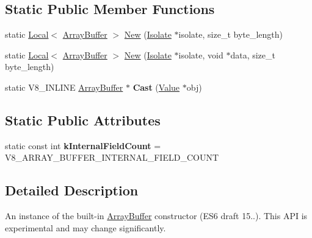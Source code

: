 \subsection*{Static Public Member Functions}
\begin{DoxyCompactItemize}
\item 
static \hyperlink{classv8_1_1Local}{Local}$<$ \hyperlink{classv8_1_1ArrayBuffer}{Array\-Buffer} $>$ \hyperlink{classv8_1_1ArrayBuffer_ad752e03d7cc7fe863656ad6183785ab7}{New} (\hyperlink{classv8_1_1Isolate}{Isolate} $\ast$isolate, size\-\_\-t byte\-\_\-length)
\item 
static \hyperlink{classv8_1_1Local}{Local}$<$ \hyperlink{classv8_1_1ArrayBuffer}{Array\-Buffer} $>$ \hyperlink{classv8_1_1ArrayBuffer_ad3e0120ae80077d607d5645c4f647932}{New} (\hyperlink{classv8_1_1Isolate}{Isolate} $\ast$isolate, void $\ast$data, size\-\_\-t byte\-\_\-length)
\item 
\hypertarget{classv8_1_1ArrayBuffer_a4b0a703ae34217507a8ebc9cabf7336a}{static V8\-\_\-\-I\-N\-L\-I\-N\-E \hyperlink{classv8_1_1ArrayBuffer}{Array\-Buffer} $\ast$ {\bfseries Cast} (\hyperlink{classv8_1_1Value}{Value} $\ast$obj)}\label{classv8_1_1ArrayBuffer_a4b0a703ae34217507a8ebc9cabf7336a}

\end{DoxyCompactItemize}
\subsection*{Static Public Attributes}
\begin{DoxyCompactItemize}
\item 
\hypertarget{classv8_1_1ArrayBuffer_af49000a2ea120e49da846ef02a42ac69}{static const int {\bfseries k\-Internal\-Field\-Count} = V8\-\_\-\-A\-R\-R\-A\-Y\-\_\-\-B\-U\-F\-F\-E\-R\-\_\-\-I\-N\-T\-E\-R\-N\-A\-L\-\_\-\-F\-I\-E\-L\-D\-\_\-\-C\-O\-U\-N\-T}\label{classv8_1_1ArrayBuffer_af49000a2ea120e49da846ef02a42ac69}

\end{DoxyCompactItemize}


\subsection{Detailed Description}
An instance of the built-\/in \hyperlink{classv8_1_1ArrayBuffer}{Array\-Buffer} constructor (E\-S6 draft 15..). This A\-P\-I is experimental and may change significantly. 

